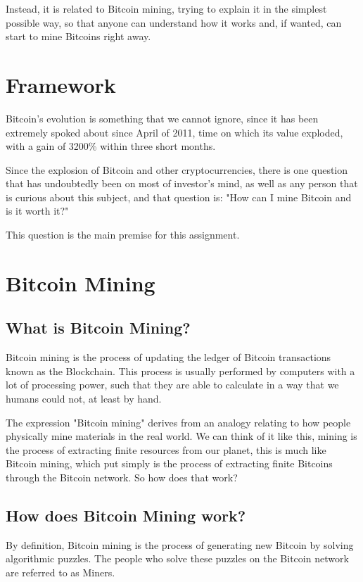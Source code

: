 \documentclass{article}
\newcommand\tab[1][1cm]{\hspace*{#1}}
\begin{document}
Instead, it is related to  Bitcoin mining, trying to explain it in the simplest possible way, so that anyone can understand how it works and, if wanted, can start to mine Bitcoins right away.

\section{Framework}

\tab Bitcoin's evolution is something that we cannot ignore, since it has been extremely spoked about since April of 2011, time on which its value exploded, with a gain of 3200\% within three short months.

Since the explosion of Bitcoin and other cryptocurrencies, there is one question that has undoubtedly been on most of investor's mind, as well as any person that is curious about this subject, and that question is: "How can I mine Bitcoin and is it worth it?"

This question is the main premise for this assignment.

\newpage

\section{Bitcoin Mining}

\subsection{What is Bitcoin Mining?}

\tab Bitcoin mining is the process of updating the ledger of Bitcoin transactions known as the Blockchain. This process is usually performed by computers with a lot of processing power, such that they are able to calculate in a way that we humans could not, at least by hand. 

The expression "Bitcoin mining" derives from an analogy relating to how people physically mine materials in the real world. We can think of it like this, mining is the process of extracting finite resources from our planet, this is much like Bitcoin mining, which put simply is the process of extracting finite Bitcoins through the Bitcoin network. So how does that work?

\subsection{How does Bitcoin Mining work?}

\tab By definition, Bitcoin mining is the process of generating new Bitcoin by solving algorithmic puzzles. The people who solve these puzzles on the Bitcoin network are referred to as Miners.
\end{document}
